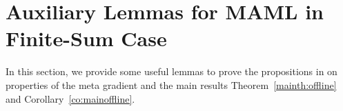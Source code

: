 \documentclass{osudissert96}
\begin{document}

\section{Auxiliary Lemmas for MAML in Finite-Sum Case}\label{aux:lemma_finite}
In this section, we provide some useful lemmas to prove the propositions in   on properties of the meta gradient and the main results Theorem~\ref{mainth:offline} and Corollary~\ref{co:mainoffline}.
\end{document}
